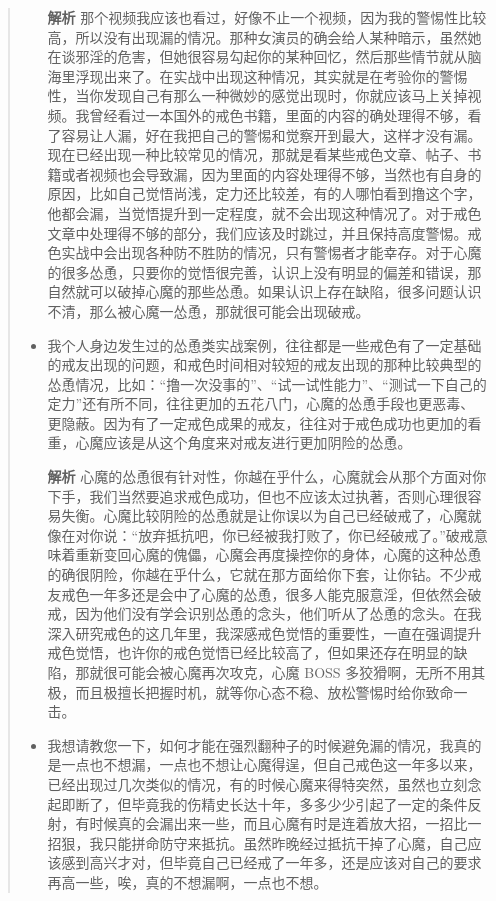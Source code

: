 \begin{quotation}
\begin{itemize}
              \textbf{解析} 那个视频我应该也看过，好像不止一个视频，因为我的警惕性比较高，所以没有出现漏的情况。那种女演员的确会给人某种暗示，虽然她在谈邪淫的危害，但她很容易勾起你的某种回忆，然后那些情节就从脑海里浮现出来了。在实战中出现这种情况，其实就是在考验你的警惕性，当你发现自己有那么一种微妙的感觉出现时，你就应该马上关掉视频。我曾经看过一本国外的戒色书籍，里面的内容的确处理得不够，看了容易让人漏，好在我把自己的警惕和觉察开到最大，这样才没有漏。现在已经出现一种比较常见的情况，那就是看某些戒色文章、帖子、书籍或者视频也会导致漏，因为里面的内容处理得不够，当然也有自身的原因，比如自己觉悟尚浅，定力还比较差，有的人哪怕看到撸这个字，他都会漏，当觉悟提升到一定程度，就不会出现这种情况了。对于戒色文章中处理得不够的部分，我们应该及时跳过，并且保持高度警惕。戒色实战中会出现各种防不胜防的情况，只有警惕者才能幸存。对于心魔的很多怂恿，只要你的觉悟很完善，认识上没有明显的偏差和错误，那自然就可以破掉心魔的那些怂恿。如果认识上存在缺陷，很多问题认识不清，那么被心魔一怂恿，那就很可能会出现破戒。
        \item 我个人身边发生过的怂恿类实战案例，往往都是一些戒色有了一定基础的戒友出现的问题，和戒色时间相对较短的戒友出现的那种比较典型的怂恿情况，比如：“撸一次没事的”、“试一试性能力”、“测试一下自己的定力”还有所不同，往往更加的五花八门，心魔的怂恿手段也更恶毒、更隐蔽。因为有了一定戒色成果的戒友，往往对于戒色成功也更加的看重，心魔应该是从这个角度来对戒友进行更加阴险的怂恿。

              \textbf{解析} 心魔的怂恿很有针对性，你越在乎什么，心魔就会从那个方面对你下手，我们当然要追求戒色成功，但也不应该太过执著，否则心理很容易失衡。心魔比较阴险的怂恿就是让你误以为自己已经破戒了，心魔就像在对你说：“放弃抵抗吧，你已经被我打败了，你已经破戒了。”破戒意味着重新变回心魔的傀儡，心魔会再度操控你的身体，心魔的这种怂恿的确很阴险，你越在乎什么，它就在那方面给你下套，让你钻。不少戒友戒色一年多还是会中了心魔的怂恿，很多人能克服意淫，但依然会破戒，因为他们没有学会识别怂恿的念头，他们听从了怂恿的念头。在我深入研究戒色的这几年里，我深感戒色觉悟的重要性，一直在强调提升戒色觉悟，也许你的戒色觉悟已经比较高了，但如果还存在明显的缺陷，那就很可能会被心魔再次攻克，心魔 BOSS 多狡猾啊，无所不用其极，而且极擅长把握时机，就等你心态不稳、放松警惕时给你致命一击。
        \item 我想请教您一下，如何才能在强烈翻种子的时候避免漏的情况，我真的是一点也不想漏，一点也不想让心魔得逞，但自己戒色这一年多以来，已经出现过几次类似的情况，有的时候心魔来得特突然，虽然也立刻念起即断了，但毕竟我的伤精史长达十年，多多少少引起了一定的条件反射，有时候真的会漏出来一些，而且心魔有时是连着放大招，一招比一招狠，我只能拼命防守来抵抗。虽然昨晚经过抵抗干掉了心魔，自己应该感到高兴才对，但毕竟自己已经戒了一年多，还是应该对自己的要求再高一些，唉，真的不想漏啊，一点也不想。


\end{itemize}
\end{quotation}

